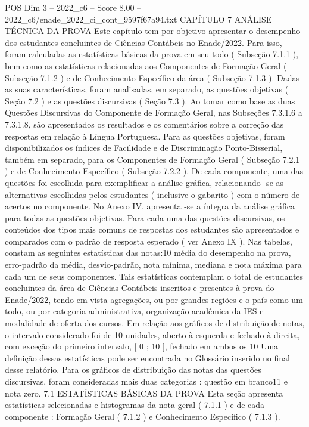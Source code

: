 \begin{textsample}{POS Dim 3 – 2022\_c6 – Score 8.00 – 2022\_c6/enade\_2022\_ci\_cont\_9597f67a94.txt}  \label{ex:f3_pos_021}
CAPÍTULO 7 ANÁLISE TÉCNICA DA PROVA Este capítulo tem por objetivo apresentar o desempenho dos estudantes concluintes de Ciências Contábeis no Enade/2022.
Para isso, foram calculadas as estatísticas básicas da prova em seu todo ( Subseção 7.1.1 ), bem como as estatísticas relacionadas aos Componentes de Formação Geral ( Subseção 7.1.2 ) e de Conhecimento Específico da área ( Subseção 7.1.3 ).
Dadas as suas características, foram analisadas, em separado, as questões objetivas ( Seção 7.2 ) e as questões discursivas ( Seção 7.3 ).
Ao tomar como base as duas Questões Discursivas do Componente de Formação Geral, nas Subseções 7.3.1.6 a 7.3.1.8, são apresentados os resultados e os comentários sobre a correção das respostas em relação à Língua Portuguesa.
Para as questões objetivas, foram disponibilizados os índices de Facilidade e de Discriminação Ponto-Bisserial, também em separado, para os Componentes de Formação Geral ( Subseção 7.2.1 ) e de Conhecimento Específico ( Subseção 7.2.2 ).
De cada componente, uma das questões foi escolhida para exemplificar a análise gráfica, relacionando -se as alternativas escolhidas pelos estudantes ( inclusive o gabarito ) com o número de acertos no componente.
No Anexo IV, apresenta -se a íntegra da análise gráfica para todas as questões objetivas.
Para cada uma das questões discursivas, os conteúdos dos tipos mais comuns de respostas dos estudantes são apresentados e comparados com o padrão de resposta esperado ( ver Anexo IX ).
Nas tabelas, constam as seguintes estatísticas das notas:10 média do desempenho na prova, erro-padrão da média, desvio-padrão, nota mínima, mediana e nota máxima para cada um de seus componentes.
Tais estatísticas contemplam o total de estudantes concluintes da área de Ciências Contábeis inscritos e presentes à prova do Enade/2022, tendo em vista agregações, ou por grandes regiões e o país como um todo, ou por categoria administrativa, organização acadêmica da IES e modalidade de oferta dos cursos.
Em relação aos gráficos de distribuição de notas, o intervalo considerado foi de 10 unidades, aberto à esquerda e fechado à direita, com exceção do primeiro intervalo, [ 0 ; 10 ], fechado em ambos os 10 Uma definição dessas estatísticas pode ser encontrada no Glossário inserido no final desse relatório.
Para os gráficos de distribuição das notas das questões discursivas, foram consideradas mais duas categorias : questão em branco11 e nota zero. 7.1 ESTATÍSTICAS BÁSICAS DA PROVA Esta seção apresenta estatísticas selecionadas e histogramas da nota geral ( 7.1.1 ) e de cada componente : Formação Geral ( 7.1.2 ) e Conhecimento Específico ( 7.1.3 ).

\end{textsample}
